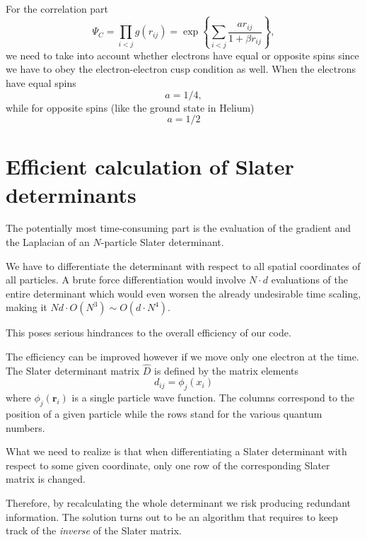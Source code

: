 \documentclass[graybox,sectrefs,envcountresetchap,open=right]{svmonodo}
\begin{document}
For the correlation part 
\[
\Psi_C=\prod_{i< j}g(r_{ij})= \exp{\left\{\sum_{i<j}\frac{ar_{ij}}{1+\beta r_{ij}}\right\}},
\]
we need to take into account whether electrons have equal or opposite spins since we have to obey the
electron-electron cusp condition as well.  
When the electrons have  equal spins 
\[
a= 1/4,
\]
while for opposite spins (like the ground state in Helium)
\[
a= 1/2
\] 








\section{Efficient calculation of Slater determinants}

The potentially most time-consuming part is the
evaluation of the gradient and the Laplacian of an $N$-particle  Slater
determinant. 

We have to differentiate the determinant with respect to
all spatial coordinates of all particles. A brute force
differentiation would involve $N\cdot d$ evaluations of the entire
determinant which would even worsen the already undesirable time
scaling, making it $Nd\cdot O(N^3)\sim O(d\cdot N^4)$.

This poses serious hindrances to the overall efficiency of our code.




The efficiency can be improved however if we move only one electron at the time.
The Slater determinant matrix $\hat{D}$ is defined by the matrix elements
\[
d_{ij}=\phi_j(x_i)
\]
where $\phi_j(\mathbf{r}_i)$ is a single particle  wave function.
The columns correspond to the position of a given particle 
while the rows stand for the various quantum numbers.








What we need to realize is that when differentiating a Slater
determinant with respect to some given coordinate, only one row of the
corresponding Slater matrix is changed. 

Therefore, by recalculating
the whole determinant we risk producing redundant information. The
solution turns out to be an algorithm that requires to keep track of
the \emph{inverse} of the Slater matrix.
\end{document}
